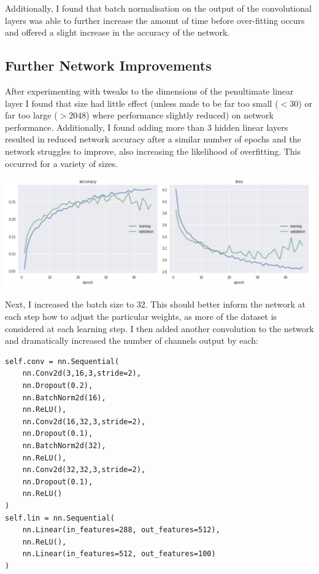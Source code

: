 \documentclass[11pt]{article}
\begin{document}
Additionally, I found that batch normalisation on the output of the convolutional layers was able to further increase the amount of time before over-fitting occurs and offered a slight increase in the accuracy of the network.

\subsection{Further Network Improvements}


After experimenting with tweaks to the dimensions of the penultimate linear layer I found that size had little effect (unless made to be far too small ($<30$) or far too large ($>2048$) where performance slightly reduced) on network performance. Additionally, I found adding more than 3 hidden linear layers resulted in reduced network accuracy after a similar number of epochs and the network struggles to improve, also increasing the likelihood of overfitting. This occurred for a variety of sizes.

    \begin{center}
        \begin{minipage}{0.75\linewidth}
            \includegraphics[width=\linewidth]{accuracy6}
        \end{minipage}%
    \end{center}
    
Next, I increased the batch size to 32. This should better inform the network at each step how to adjust the particular weights, as more of the dataset is considered at each learning step. I then added another convolution to the network and dramatically increased the number of channels output by each:

\begin{small}
\begin{verbatim}
self.conv = nn.Sequential(
    nn.Conv2d(3,16,3,stride=2),
    nn.Dropout(0.2),
    nn.BatchNorm2d(16),
    nn.ReLU(),
    nn.Conv2d(16,32,3,stride=2),
    nn.Dropout(0.1),
    nn.BatchNorm2d(32),
    nn.ReLU(),
    nn.Conv2d(32,32,3,stride=2),
    nn.Dropout(0.1),
    nn.ReLU()
)
self.lin = nn.Sequential(
    nn.Linear(in_features=288, out_features=512),
    nn.ReLU(),
    nn.Linear(in_features=512, out_features=100)
)
\end{verbatim}
\end{small}
\end{document}
